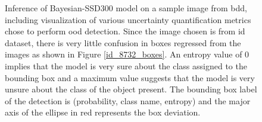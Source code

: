 \begin{figure}[H]
    	\caption[Bayesian SSd300 inference on image fro \acrshort{bdd}]{Inference of Bayesian-SSD300 model on a sample image from \acrshort{bdd}, including visualization of various uncertainty quantification metrics chose to perform \acrshort{ood} detection. Since the image chosen is from \acrshort{id} dataset, there is very little confusion in boxes regressed from the images as shown in Figure \ref{id_8732_boxes}. An entropy value of 0 implies that the model is very sure about the class assigned to the bounding box and a maximum value suggests that the model is very unsure about the class of the object present. The bounding box label of the detection is (probability, class name, entropy) and the major axis of the ellipse in red represents the box deviation.}
    	\label{uq_observations}
    \end{figure}
    
